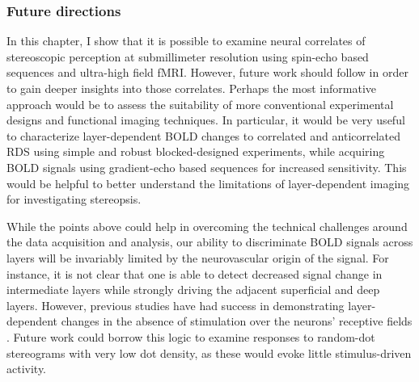 \subsubsection*{Future directions}

In this chapter, I show that it is possible to examine neural correlates of stereoscopic perception at submillimeter resolution using spin-echo based sequences and ultra-high field fMRI. However, future work should follow in order to gain deeper insights into those correlates. Perhaps the most informative approach would be to assess the suitability of more conventional experimental designs and functional imaging techniques. In particular, it would be very useful to characterize layer-dependent BOLD changes to correlated and anticorrelated RDS using simple and robust blocked-designed experiments, while acquiring BOLD signals using gradient-echo based sequences for increased sensitivity. This would be helpful to better understand the limitations of layer-dependent imaging for investigating stereopsis. 

While the points above could help in overcoming the technical challenges around the data acquisition and analysis, our ability to discriminate BOLD signals across layers will be invariably limited by the neurovascular origin of the signal. For instance, it is not clear that one is able to detect decreased signal change in intermediate layers while strongly driving the adjacent superficial and deep layers. However, previous studies have had success in demonstrating layer-dependent changes in the absence of stimulation over the neurons' receptive fields \cite{Kok:2016fk}. Future work could borrow this logic to examine responses to random-dot stereograms with very low dot density, as these would evoke little stimulus-driven activity.  




